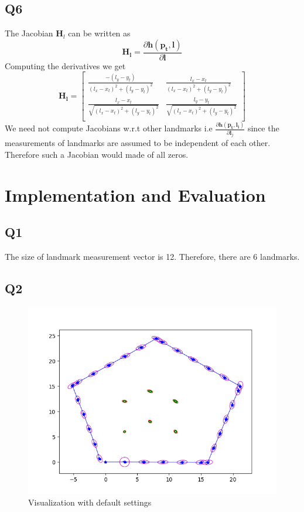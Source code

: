 \documentclass[12pt, a4paper]{article}
\begin{document}
\subsection{Q6}
The Jacobian $\mathbf{H}_l$ can be written as
\[\mathbf{H_l} = \frac{\partial \mathbf{h(\mathbf{p}_t, \mathbf{l})}}{\partial\mathbf{l}}\]
Computing the derivatives we get
\[\mathbf{H_l} = \begin{bmatrix}
  \frac{-(l_y - y_t)}{(l_x - x_t)^2 + (l_y - y_t)^2} & \frac{l_x - x_t}{(l_x - x_t)^2 + (l_y - y_t)^2}\\
  \frac{l_x - x_t}{\sqrt{(l_x - x_t)^2 + (l_y - y_t)^2}} & \frac{l_y - y_t}{\sqrt{(l_x - x_t)^2 + (l_y - y_t)^2}}\\
\end{bmatrix}\]
We need not compute Jacobians w.r.t other landmarks i.e $\frac{\partial \mathbf{h(\mathbf{p}_t, \mathbf{l}_i)}}{\partial\mathbf{l}_j}$ since the measurements of landmarks are assumed to be independent of each other. Therefore such a Jacobian would made of all zeros.


\section{Implementation and Evaluation}
\subsection{Q1}
The size of landmark measurement vector is 12. Therefore, there are 6 landmarks.
\subsection{Q2}
\begin{figure}[H]
  \centering
  \includegraphics[width=1\textwidth]{./results/q2_2/result.png}
  \caption{Visualization with default settings}
\end{figure}
\end{document}
